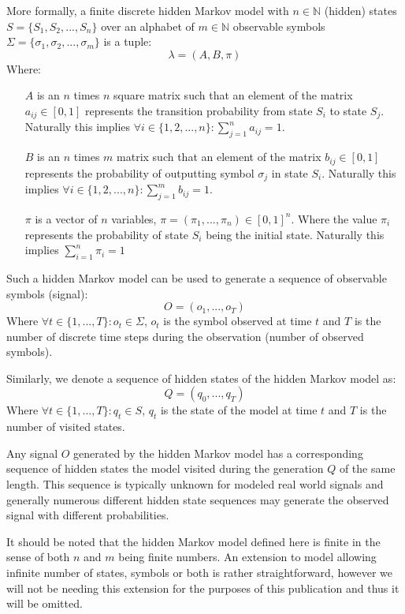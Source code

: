 More formally, a finite discrete hidden Markov model with $n \in \mathbb{N}$ (hidden) states $S = \{S_1, S_2, ..., S_n\}$ over an alphabet of $m \in \mathbb{N}$ observable symbols $\Sigma=\{\sigma_1, \sigma_2, ..., \sigma_m\}$ is a tuple: $$\lambda = (A, B, \pi)$$
Where:
\begin{itemize}
	\item[$A$] is an $n$ times $n$ square matrix such that an element of the matrix ${a_{ij} \in [0, 1]}$ represents the transition probability from state $S_i$ to state $S_j$. Naturally this implies ${\forall i \in \{1, 2, ..., n\}: \sum_{j=1}^n{a_{ij}} = 1}$.
	\item[$B$] is an $n$ times $m$ matrix such that an element of the matrix ${b_{ij} \in [0, 1]}$ represents the probability of outputting symbol $\sigma_j$ in state $S_i$. Naturally this implies ${\forall i \in \{1, 2, ..., n\}: \sum_{j=1}^m{b_{ij}} = 1}$.
	\item[$\pi$] is a vector of $n$ variables, ${\pi=(\pi_1, ..., \pi_n) \in [0, 1]^n}$. Where the value $\pi_i$ represents the probability of state $S_i$ being the initial state. Naturally this implies ${\sum_{i=1}^n{\pi_i} = 1}$
\end{itemize}

Such a hidden Markov model can be used to generate a sequence of observable symbols (signal): $$O = (o_1, ..., o_T)$$
Where ${\forall t \in \{1, ..., T\}: o_t \in \Sigma}$, $o_t$ is the symbol observed at time $t$ and $T$ is the number of discrete time steps during the observation (number of observed symbols).

Similarly, we denote a sequence of hidden states of the hidden Markov model as: $$Q = (q_0, ..., q_T)$$
Where ${\forall t \in \{1, ..., T\}: q_t \in S}$, $q_t$ is the state of the model at time $t$ and $T$ is the number of visited states.

Any signal $O$ generated by the hidden Markov model has a corresponding sequence of hidden states the model visited during the generation $Q$ of the same length. This sequence is typically unknown for modeled real world signals and generally numerous different hidden state sequences may generate the observed signal with different probabilities.

It should be noted that the hidden Markov model defined here is finite in the sense of both $n$ and $m$ being finite numbers. An extension to model allowing infinite number of states, symbols or both is rather straightforward, however we will not be needing this extension for the purposes of this publication and thus it will be omitted.

